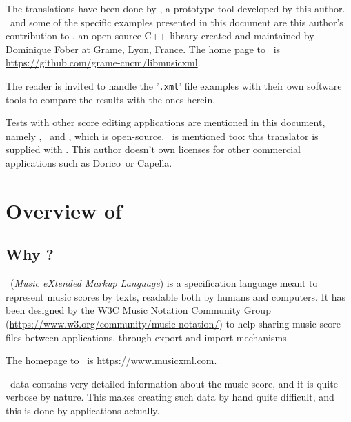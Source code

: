 \documentclass[12pt,a4paper]{article}
\begin{document}
The translations have been done by \xmlToLy, a prototype tool developed by this author. \xmlToLy\ and some of the specific examples presented in this document are this author's contribution to \lib, an open-source C++ library created and maintained by Dominique Fober at Grame, Lyon, France. The home page to \lib\ is \url{https://github.com/grame-cncm/libmusicxml}.

The reader is invited to handle the '{\tt .xml}' file examples with their own software tools to compare the results with the ones herein.

Tests with other score editing applications are mentioned in this document, namely \sib,
\fin\ and \muse, which is open-source.
\mxmlToLy\ is mentioned too: this translator is supplied with \lily.
This author doesn't own licenses for other commercial applications such as Dorico\texttrademark\ or Capella\texttrademark.


\section{Overview of \xmlToLy\ }

\subsection{Why \xmlToLy?}

\mxml\ ({\it Music eXtended Markup Language}) is a specification language meant to represent music scores by texts, readable both by humans and computers. It has been designed by the W3C Music Notation Community Group (\url{https://www.w3.org/community/music-notation/}) to help sharing music score files between applications, through export and import mechanisms.

The homepage to \mxml\ is \url{https://www.musicxml.com}.

\mxml\ data contains very detailed information about the music score, and it is quite verbose by nature. This makes creating such data by hand quite difficult, and this is done by applications actually.
\end{document}
